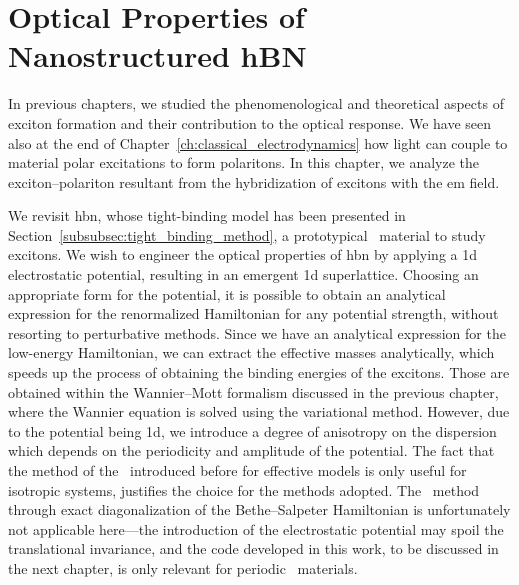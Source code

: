 
%

\chapter{Optical Properties of Nanostructured hBN}
\label{ch:Optical_hBN_superlattice}
\glsresetall
In previous chapters, we studied the phenomenological and theoretical aspects of exciton formation and their contribution to the optical response.
We have seen also at the end of Chapter~\ref{ch:classical_electrodynamics} how light can couple to material polar excitations to form polaritons.
In this chapter, we analyze the exciton--polariton resultant from the hybridization of excitons with the \gls{em} field.

We revisit \gls{hbn}, whose tight-binding model has been presented in Section~\ref{subsubsec:tight_binding_method}, a prototypical \bd~material to study excitons.
We wish to engineer the optical properties of \gls{hbn} by applying a \gls{1d} electrostatic potential, resulting in an emergent \gls{1d} superlattice.
Choosing an appropriate form for the potential, it is possible to obtain an analytical expression for the renormalized Hamiltonian for any potential strength, without resorting to perturbative methods.
Since we have an analytical expression for the low-energy Hamiltonian, we can extract the effective masses analytically, which speeds up the process of obtaining the binding energies of the excitons.
Those are obtained within the Wannier--Mott formalism discussed in the previous chapter, where the Wannier equation is solved using the variational method.
However, due to the potential being \gls{1d}, we introduce a degree of anisotropy on the dispersion which depends on the periodicity and amplitude of the potential.
The fact that the method of the \bse~introduced before for effective models is only useful for isotropic systems, justifies the choice for the methods adopted.
The \bse~method through exact diagonalization of the Bethe--Salpeter Hamiltonian is unfortunately not applicable here---the introduction of the electrostatic potential may spoil the translational invariance, and the code developed in this work, to be discussed in the next chapter, is only relevant for periodic \bd~materials.

